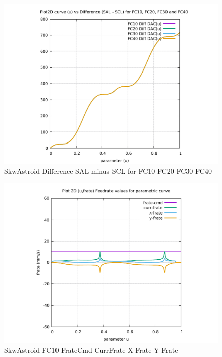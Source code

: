\begin{figure}
	\caption     {SkwAstroid Difference SAL minus SCL for FC10 FC20 FC30 FC40}
	\label{26-img-SkwAstroid-Difference-SAL-minus-SCL-for-FC10-FC20-FC30-FC40.pdf}
	\includegraphics[width=1.00\textwidth]{Chap4/appendix/app-SkwAstroid/plots/26-img-SkwAstroid-Difference-SAL-minus-SCL-for-FC10-FC20-FC30-FC40.pdf}
\end{figure}


\clearpage
\pagebreak

\begin{figure}
	\caption     {SkwAstroid FC10 FrateCmd CurrFrate X-Frate Y-Frate}
	\label{27-img-SkwAstroid-FC10-FrateCmd-CurrFrate-X-Frate-Y-Frate.pdf}
	\includegraphics[width=1.00\textwidth]{Chap4/appendix/app-SkwAstroid/plots/27-img-SkwAstroid-FC10-FrateCmd-CurrFrate-X-Frate-Y-Frate.pdf}
\end{figure}


